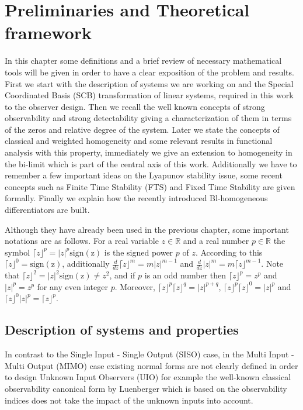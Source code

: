 \documentclass[11pt,letterpaper,twoside,openright]{report}
\newcommand{\sign}[1]{\mathrm{sign(#1)}}
\newcommand{\sig}[2]{\lceil#1\rfloor^{#2}}
\newcommand{\abs}[2]{|#1|^{#2}}
\begin{document}
	\chapter{Preliminaries and Theoretical framework}	
In this chapter some definitions and a brief review of necessary mathematical tools will be given in order to have a clear exposition of the problem and results. First we start with the description of systems we are working on and the Special Coordinated Basis (SCB) transformation of linear systems, required in this work to the observer design. Then we recall the well known concepts of strong observability and strong detectability giving a characterization of them in terms of the zeros and relative degree of the system. Later we state the concepts of classical and weighted homogeneity and some relevant results in functional analysis with this property, immediately we give an extension to homogeneity in the bi-limit which is part of the central axis of this work. Additionally we have to remember a few important ideas on the Lyapunov stability issue, some recent concepts such as Finite Time Stability (FTS) and Fixed Time Stability are given formally. Finally we explain how the recently introduced Bl-homogeneous differentiators are built.

Although they have already been used in the previous chapter, some important notations are as follows. For a real variable $z\in \mathbb{R}$ and a real number $p\in \mathbb{R}$ the symbol $\sig{z}{p}=\abs{z}{p}\sign{z}$ is the signed power $p$ of $z$. According to this $\sig{z}{0}=\sign{z}$, additionally $\frac{d}{dz}\sig{z}{m}=m\abs{z}{m-1}$ and $\frac{d}{dz}\abs{z}{m}=m\sig{z}{m-1}$. Note that $\sig{z}{2}=\abs{z}{2}\sign{z} \neq z^2$, and if $p$ is an odd number then $\sig{z}{p}=z^p$ and $\abs{z}{p}=z^p$ for any even integer $p$. Moreover, $\sig{z}{p}\sig{z}{q}=\abs{z}{p+q}$, $\sig{z}{p}\sig{z}{0}=\abs{z}{p}$ and $\sig{z}{0}\abs{z}{p}=\sig{z}{p}$.

\section{Description of systems and properties}
In contrast to the Single Input - Single Output (SISO) case, in the Multi Input - Multi Output (MIMO) case existing normal forms are not clearly defined in order to design Unknown Input Observers (UIO) for example the well-known classical observability canonical form by Luenberger \cite{Luenberger1967}\cite{Gupta1974} which is based on the observability indices does not take the impact of the unknown inputs into account.
\end{document}
